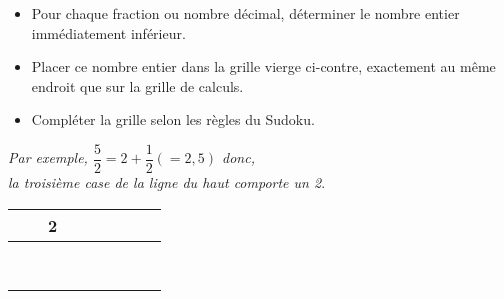 \Recreation

\enigme[Sudofractions]
   \begin{minipage}{7.5cm}
      \begin{itemize}
         \item Pour chaque fraction ou nombre décimal, déterminer le nombre entier immédiatement inférieur.
         \item Placer ce nombre entier dans la grille vierge ci-contre, exactement au même endroit que sur la grille de calculs.
         \item Compléter la grille selon les règles du Sudoku.
      \end{itemize}
      {\it Par exemple, $\dfrac{5}{2} =2+\dfrac{1}{2} (=2,5)$ donc, \\ [1mm]
         la troisième case de la ligne du haut comporte un 2}.
   \end{minipage}
   \qquad
   \begin{minipage}{7cm}
  {
      \begin{tabular}{|*{3}{C{0.5}|}|*{3}{C{0.5}|}|*{3}{C{0.5}|}}
         \hline
         & & {\bf 2} & & & & & & \\
         \hline
         & & & & & & & & \\
         \hline
         & & & & & & & & \\
         \hline
         \hline
         & & & & & & & & \\
         \hline
         & & & & & & & & \\
         \hline
         & & & & & & & & \\
         \hline
         \hline
         & & & & & & & & \\
         \hline
         & & & & & & & & \\
         \hline
         & & & & & & & & \\
         \hline
      \end{tabular}}
   \end{minipage}
  \vfill
